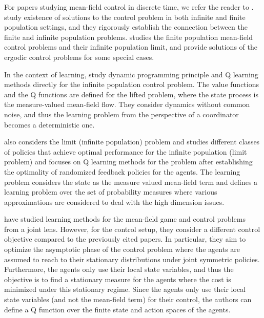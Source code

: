 \documentclass[twoside,11pt]{article}
\begin{document}
For papers studying mean-field control in discrete time, we refer the reader to \cite{motte2022quantitative,bauerle2021mean,gu2021mean,gu2019dynamic,motte2022mean,carmona2019model}. \cite{motte2022quantitative,motte2022mean} study existence of solutions to the control problem in both infinite and finite population settings, and they rigorously establish the connection between the finite and infinite population problems.  \cite{bauerle2021mean} studies the finite population mean-field control problems and their infinite population limit, and provide solutions of the ergodic control problems for some special cases.

In the context of learning,  \cite{gu2021mean,gu2019dynamic} study dynamic programming principle and Q learning methods directly for the infinite population control problem. The value functions and the Q functions are defined for the lifted problem, where the state process is the measure-valued mean-field flow. They consider dynamics without common noise, and thus the learning problem from the perspective of a coordinator becomes a deterministic one. 

\cite{carmona2019model} also considers the limit (infinite population) problem and studies different classes of policies that achieve optimal performance for the infinite population (limit problem) and focuses on Q learning methods for the problem after establishing the optimality of randomized feedback policies for the agents. The learning problem considers the state as the measure valued mean-field term and defines a learning problem over the set of probability measures where various approximations are considered to deal with the high dimension issues.

\cite{angiuli2023convergence,angiuli2022unified} have studied learning methods for the mean-field game and control problems from  a joint lens. However, for the control setup, they consider a different control objective compared to the previously cited papers. In particular, they aim to optimize the asymptotic phase of the control problem where the agents are assumed to reach to their stationary distributions under joint symmetric policies. Furthermore, the agents only use their local state variables, and thus the objective is to find a stationary measure for the agents where the cost is minimized under this stationary regime. Since the agents only use their local state variables (and not the mean-field term) for their control, the authors can define a Q function over the finite state and action spaces of the agents.
\end{document}
